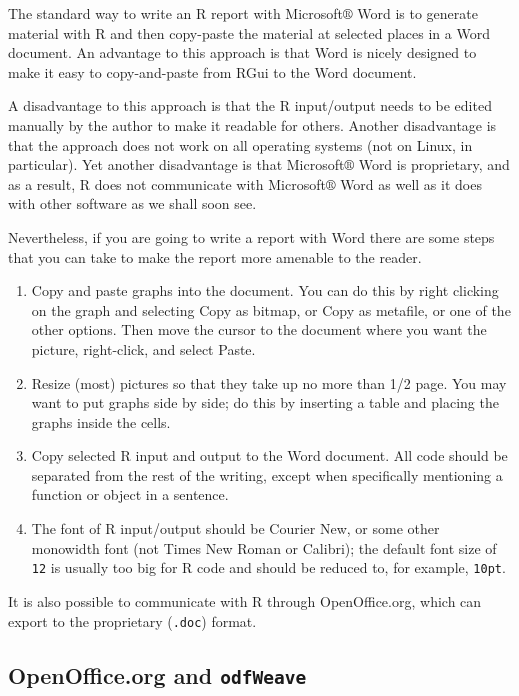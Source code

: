 \documentclass[captions=tableheading]{scrbook}
\begin{document}
The standard way to write an \textsf{R} report with Microsoft\(\circledR\) Word is to generate material with \textsf{R} and then copy-paste the material at selected places in a Word document. An advantage to this approach is that Word is nicely designed to make it easy to copy-and-paste from \textsf{RGui} to the Word document.

A disadvantage to this approach is that the R input/output needs to be edited manually by the author to make it readable for others. Another disadvantage is that the approach does not work on all operating systems (not on Linux, in particular). Yet another disadvantage is that Microsoft\(\circledR\) Word is proprietary, and as a result, \textsf{R} does not communicate with Microsoft\(\circledR\) Word as well as it does with other software as we shall soon see.

Nevertheless, if you are going to write a report with Word there are some steps that you can take to make the report more amenable to the reader. 

\begin{enumerate}
\item Copy and paste graphs into the document. You can do this by right clicking on the graph and selecting \textsf{Copy as bitmap,} or \textsf{Copy as metafile}, or one of the other options. Then move the cursor to the document where you want the picture, right-click, and select \textsf{Paste}.
\item Resize (most) pictures so that they take up no more than 1/2 page. You may want to put graphs side by side; do this by inserting a table and placing the graphs inside the cells.
\item Copy selected \textsf{R} input and output to the Word document. All code should be separated from the rest of the writing, except when specifically mentioning a function or object in a sentence.
\item The font of \textsf{R} input/output should be Courier New, or some other monowidth font (not Times New Roman or Calibri); the default font size of \texttt{12} is usually too big for \textsf{R} code and should be reduced to, for example, \texttt{10pt}.
\end{enumerate}

It is also possible to communicate with \textsf{R} through OpenOffice.org, which can export to the proprietary (\texttt{.doc}) format.
\subsection{OpenOffice.org and \texttt{odfWeave}}
\label{sec-22-2-2}
\end{document}
